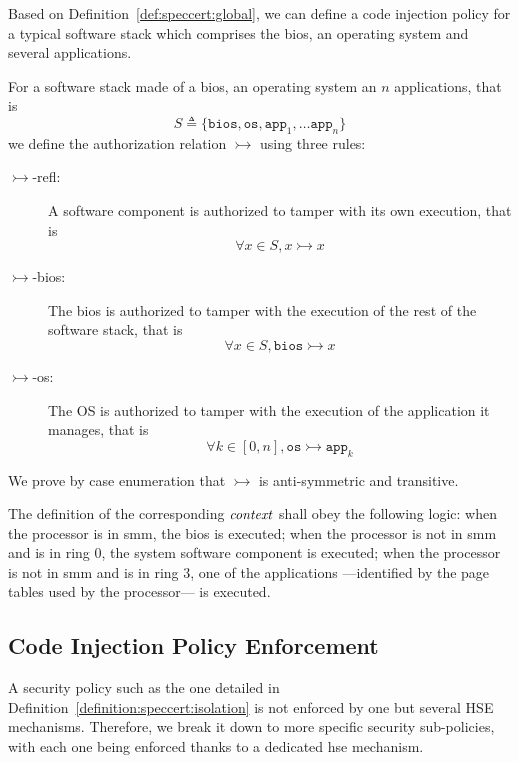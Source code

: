 Based on Definition~\ref{def:speccert:global}, we can define a code injection
policy for a typical software stack which comprises the \ac{bios}, an
operating system and several applications.

\begin{definition}
  \label{definition:speccert:isolation}

  For a software stack made of a \ac{bios}, an operating system an \( n \)
  applications, that is
  \[
    S \triangleq \{ \mathtt{bios}, \mathtt{os}, \mathtt{app}_1, \dots
    \mathtt{app}_n \}
  \]
  we define the authorization relation $\rightarrowtail$ using three rules:
  \begin{description}
  \item [\(\rightarrowtail\)-refl:] A software component is authorized to tamper
    with its own execution, that is
    \[ \forall x \in S, x \rightarrowtail x \]
  \item [\(\rightarrowtail\)-bios:] The \ac{bios} is authorized to tamper with
    the execution of the rest of the software stack, that is
    \[ \forall x \in S, \mathtt{bios} \rightarrowtail x \]
  \item [\(\rightarrowtail\)-os:] The OS is authorized to tamper with the
    execution of the application it manages, that is
    \[ \forall k \in [0, n], \mathtt{os} \rightarrowtail \mathtt{app}_k \]
  \end{description}

  We prove by case enumeration that $\rightarrowtail$ is anti-symmetric and
  transitive.

  The definition of the corresponding $\mathit{context}$ shall obey the following
  logic: when the processor is in \ac{smm}, the \ac{bios} is executed; when the
  processor is not in \ac{smm} and is in ring 0, the system software component
  is executed; when the processor is not in \ac{smm} and is in ring 3, one of
  the applications ---identified by the page tables used by the processor--- is
  executed.
\end{definition}

\subsection{Code Injection Policy Enforcement}
\label{subsec:speccert:isolationenforcement}

A security policy such as the one detailed in
Definition~\ref{definition:speccert:isolation} is not enforced by one but
several HSE mechanisms.
%
Therefore, we break it down to more specific security sub-policies, with each
one being enforced thanks to a dedicated \ac{hse} mechanism.

